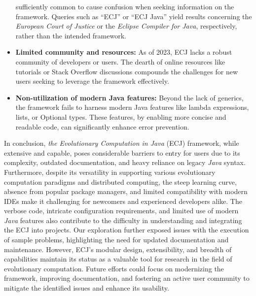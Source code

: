 \begin{itemize}
      sufficiently common to cause confusion when seeking information on the 
      framework.
      Queries such as \enquote{ECJ} or \enquote{ECJ Java} yield results 
      concerning the \textit{European Court of Justice} or the \textit{Eclipse 
      Compiler for Java}, respectively, rather than the intended framework.
    \item \textbf{Limited community and resources:} As of 2023, ECJ lacks a 
      robust community of developers or users.
      The dearth of online resources like tutorials or Stack Overflow 
      discussions compounds the challenges for new users seeking to leverage 
      the framework effectively.
    \item \textbf{Non-utilization of modern Java features:} Beyond the lack of 
      generics, the framework fails to harness modern Java features like lambda 
      expressions, lists, or Optional types.
      These features, by enabling more concise and readable code, can 
      significantly enhance error prevention.
  \end{itemize}

  In conclusion, \textit{the Evolutionary Computation in Java} (ECJ) framework, 
  while extensive and capable, poses considerable barriers to entry for users 
  due to its complexity, outdated documentation, and heavy reliance on legacy 
  \textit{Java} syntax.
  Furthermore, despite its versatility in supporting various evolutionary 
  computation paradigms and distributed computing, the steep learning curve, 
  absence from popular package managers, and limited compatibility with modern 
  IDEs make it challenging for newcomers and experienced developers alike.
  The verbose code, intricate configuration requirements, and limited use of 
  modern \textit{Java} features also contribute to the difficulty in understanding and 
  integrating the ECJ into projects.
  Our exploration further exposed issues with the execution of sample problems, 
  highlighting the need for updated documentation and maintenance.
  However, ECJ's modular design, extensibility, and breadth of capabilities 
  maintain its status as a valuable tool for research in the field of 
  evolutionary computation.
  Future efforts could focus on modernizing the framework, improving 
  documentation, and fostering an active user community to mitigate the 
  identified issues and enhance its usability.
